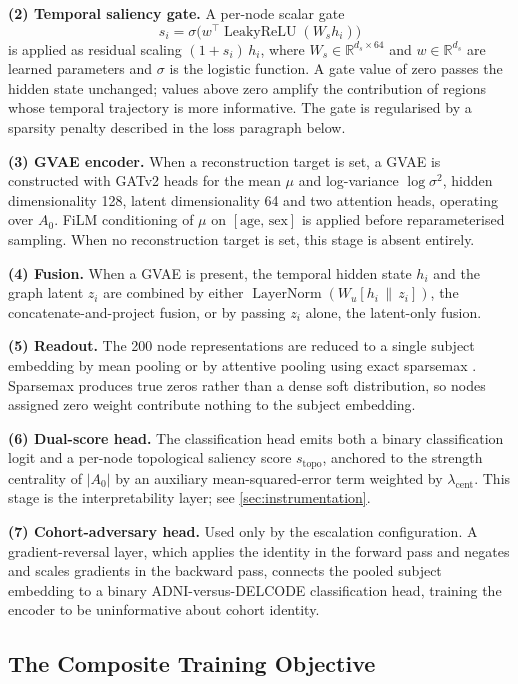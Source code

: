 \textbf{(2) Temporal saliency gate.} A per-node scalar gate
\[
  s_i = \sigma\!\bigl(w^\top \operatorname{LeakyReLU}(W_s h_i)\bigr)
\]
is applied as residual scaling $(1 + s_i)\,h_i$, where $W_s \in \mathbb{R}^{d_s \times
64}$ and $w \in \mathbb{R}^{d_s}$ are learned parameters and $\sigma$ is the logistic
function. A gate value of zero passes the hidden state unchanged; values above zero amplify
the contribution of regions whose temporal trajectory is more informative. The gate is
regularised by a sparsity penalty described in the loss paragraph below.

\textbf{(3) GVAE encoder.} When a reconstruction target is set, a \ac{GVAE} is constructed with GATv2
heads for the mean $\mu$ and log-variance $\log\sigma^2$, hidden dimensionality 128,
latent dimensionality 64 and two attention heads, operating over $A_0$. FiLM conditioning
of $\mu$ on $[\text{age},\, \text{sex}]$ is applied before reparameterised sampling. When no reconstruction target is set, this stage is absent entirely.

\textbf{(4) Fusion.} When a \ac{GVAE} is present, the temporal hidden state $h_i$ and
the graph latent $z_i$ are combined by either
$\operatorname{LayerNorm}(W_u[h_i \,\|\, z_i])$, the concatenate-and-project fusion, or by
passing $z_i$ alone, the latent-only fusion.

\textbf{(5) Readout.} The 200 node representations are reduced to a single subject
embedding by mean pooling or by attentive pooling using exact sparsemax
\parencite{martins2016sparsemax}. Sparsemax produces true zeros rather than a dense soft
distribution, so nodes assigned zero weight contribute nothing to the subject embedding.

\textbf{(6) Dual-score head.} The classification head emits both a binary classification
logit and a per-node topological saliency score $s_{\text{topo}}$, anchored to the
strength centrality of $|A_0|$ by an auxiliary mean-squared-error term weighted by
$\lambda_{\text{cent}}$. This stage is the interpretability layer; see
\autoref{sec:instrumentation}.

\textbf{(7) Cohort-adversary head.} Used only by the escalation configuration. A gradient-reversal
layer, which applies the identity in the forward pass and negates and scales gradients in
the backward pass, connects the pooled subject embedding to a binary
\ac{ADNI}-versus-\ac{DELCODE} classification head, training the encoder to be uninformative about
cohort identity.

\subsection{The Composite Training Objective}\label{sec:tfgn-loss-section}

